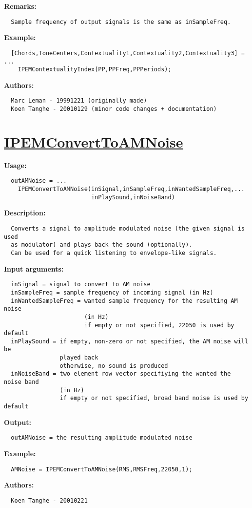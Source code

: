 \textbf{Remarks:}
\begin{verbatim}  Sample frequency of output signals is the same as inSampleFreq.

\end{verbatim}
\textbf{Example:}
\begin{verbatim}  [Chords,ToneCenters,Contextuality1,Contextuality2,Contextuality3] = ...
    IPEMContextualityIndex(PP,PPFreq,PPPeriods);

\end{verbatim}
\textbf{Authors:}
\begin{verbatim}  Marc Leman - 19991221 (originally made)
  Koen Tanghe - 20010129 (minor code changes + documentation)
\end{verbatim}


\newpage
\section*{\hyperlink{Concepts:IPEMConvertToAMNoise}{IPEMConvertToAMNoise}}
\hypertarget{FuncRef:IPEMConvertToAMNoise}{}

\textbf{Usage:}
\begin{verbatim}  outAMNoise = ...
    IPEMConvertToAMNoise(inSignal,inSampleFreq,inWantedSampleFreq,...
                         inPlaySound,inNoiseBand)

\end{verbatim}
\textbf{Description:}
\begin{verbatim}  Converts a signal to amplitude modulated noise (the given signal is used
  as modulator) and plays back the sound (optionally).
  Can be used for a quick listening to envelope-like signals.

\end{verbatim}
\textbf{Input arguments:}
\begin{verbatim}  inSignal = signal to convert to AM noise
  inSampleFreq = sample frequency of incoming signal (in Hz)
  inWantedSampleFreq = wanted sample frequency for the resulting AM noise
                       (in Hz)
                       if empty or not specified, 22050 is used by default
  inPlaySound = if empty, non-zero or not specified, the AM noise will be
                played back
                otherwise, no sound is produced
  inNoiseBand = two element row vector specifiying the wanted the noise band
                (in Hz)
                if empty or not specified, broad band noise is used by default

\end{verbatim}
\textbf{Output:}
\begin{verbatim}  outAMNoise = the resulting amplitude modulated noise

\end{verbatim}
\textbf{Example:}
\begin{verbatim}  AMNoise = IPEMConvertToAMNoise(RMS,RMSFreq,22050,1);

\end{verbatim}
\textbf{Authors:}
\begin{verbatim}  Koen Tanghe - 20010221
\end{verbatim}


